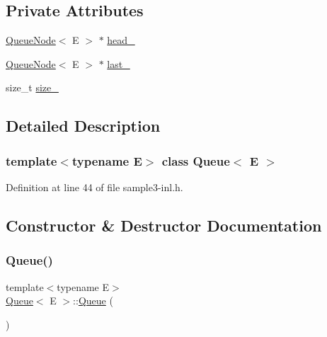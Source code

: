 \subsection*{Private Attributes}
\begin{DoxyCompactItemize}
\item 
\hyperlink{classQueueNode}{Queue\+Node}$<$ E $>$ $\ast$ \hyperlink{classQueue_abf9219bcea800d26e8bfdb4777d98729}{head\+\_\+}
\item 
\hyperlink{classQueueNode}{Queue\+Node}$<$ E $>$ $\ast$ \hyperlink{classQueue_a7466dca4f96147c9124af582ab170df0}{last\+\_\+}
\item 
size\+\_\+t \hyperlink{classQueue_a7ac3c0717d894e1aecc56f4ddb35c7ea}{size\+\_\+}
\end{DoxyCompactItemize}


\subsection{Detailed Description}
\subsubsection*{template$<$typename E$>$\newline
class Queue$<$ E $>$}



Definition at line 44 of file sample3-\/inl.\+h.



\subsection{Constructor \& Destructor Documentation}
\mbox{\label{classQueue_ab09891e54b51dc677ee6efb350687ae4}} 
\subsubsection{\texorpdfstring{Queue()}{Queue()}\hspace{0.1cm}{\footnotesize\ttfamily [1/2]}}
{\footnotesize\ttfamily template$<$typename E$>$ \\
\hyperlink{classQueue}{Queue}$<$ E $>$\+::\hyperlink{classQueue}{Queue} (\begin{DoxyParamCaption}{ }\end{DoxyParamCaption})\hspace{0.3cm}{\ttfamily [inline]}}



